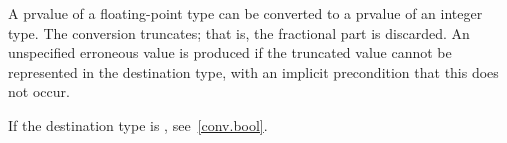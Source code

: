 \pnum
{}%
A prvalue of a floating-point type can be converted to a prvalue of an
integer type. The conversion truncates; that is, the fractional part is
discarded.
%
An unspecified erroneous value is produced
if the truncated value cannot be represented
in the destination type,
with an implicit precondition that this does not occur.
%
%
%
%
%
\begin{note}
If the destination type is , see~\ref{conv.bool}.
\end{note}



